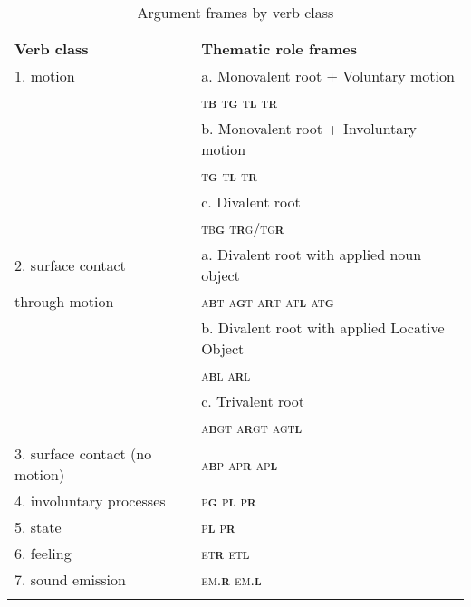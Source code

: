 \documentclass[output=paper]{langsci/langscibook}
\begin{document}
\begin{table}
\caption{Argument frames by verb class}
\label{tab:sibanda:2}

\begin{tabularx}{\textwidth}{Xl}
\lsptoprule
{Verb class} & {Thematic role frames}\\
\midrule

{1. motion} & {a. Monovalent root + Voluntary motion} \\
& \textsc{t}\textbf{\textsc{b}} \textsc{t}\textbf{\textsc{g}} \textsc{t}\textbf{\textsc{l}} \textsc{t}\textbf{\textsc{r}} \\
& {b. Monovalent root + Involuntary motion} \\
& \textsc{t}\textbf{\textsc{g}} \textsc{t}\textbf{\textsc{l}} \textsc{t}\textbf{\textsc{r}} \\
& {c. Divalent root} \\
& \textsc{tb}\textbf{\textsc{g}} \textsc{t}\textbf{\textsc{r}}\textsc{g/tg}\textbf{\textsc{r}}\\
\tablevspace
{2. surface contact} & {a. Divalent root with applied noun object} \\
 through motion& \textsc{a}\textbf{\textsc{b}}\textsc{t} \textsc{a}\textbf{\textsc{g}}\textsc{t} \textsc{a}\textbf{\textsc{r}}\textsc{t} \textsc{at}\textbf{\textsc{l}} \textsc{at}\textbf{\textsc{g}} \\
& {b. Divalent root with applied Locative Object} \\
& \textsc{a}\textbf{\textsc{b}}\textsc{l}  \textsc{a}\textbf{\textsc{r}}\textsc{l} \\
& {c. Trivalent root} \\
& \textsc{a}\textbf{\textsc{b}}\textsc{gt} \textsc{a}\textbf{\textsc{r}}\textsc{gt} \textsc{agt}\textbf{\textsc{l}}\\
\tablevspace
{3. surface contact (no motion)} & {\textsc{a}\textbf{\textsc{b}}\textsc{p ap}\textbf{\textsc{r}} \textsc{ap}\textbf{\textsc{l}}}\\
\tablevspace
{4. involuntary processes}  & {\textsc{p}\textbf{\textsc{g}} \textsc{p}\textbf{\textsc{l}} \textsc{p}\textbf{\textsc{r}}}\\

\tablevspace
{5. state} & {\textsc{p}\textbf{\textsc{l}} \textsc{p}\textbf{\textsc{r}}}\\

\tablevspace
{6. feeling} & {\textsc{et}\textbf{\textsc{r}} \textsc{et}\textbf{\textsc{l}}}\\

\tablevspace
{7. sound emission}  & {\textsc{em.}\textbf{\textsc{r}} \textsc{em.}\textbf{\textsc{l}}}\\
\lspbottomrule
\end{tabularx}
\end{table}
\end{document}
